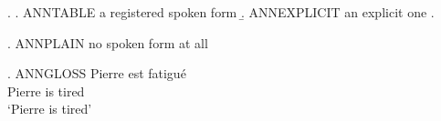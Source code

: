 
\setlength{\ExAnnotColumn}{9cm}
\ex.
\a. ANNTABLE a registered spoken form\exannot{[CP]}
\b. ANNEXPLICIT an explicit one
\z.

\ex. ANNPLAIN no spoken form at all\exannot{[ZP]}

\ex. \gll ANNGLOSS Pierre est fatigu\'e \exannot{[CPG]}\\
          Pierre is tired\\
     \glt `Pierre is tired'


